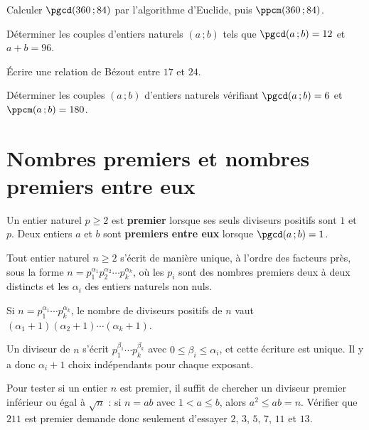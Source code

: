 \begin{entrainement}
\exo[\niveau{1}] Calculer $\pgcd(360\,;84)$ par l'algorithme d'Euclide, puis
$\ppcm(360\,;84)$.

\exo[\niveau{2}] Déterminer les couples d'entiers naturels $(a\,;b)$ tels que
$\pgcd(a\,;b) = 12$ et $a+b = 96$.

\exo[\niveau{2}] Écrire une relation de Bézout entre $17$ et $24$.

\exo[\niveau{3}] Déterminer les couples $(a\,;b)$ d'entiers naturels vérifiant
$\pgcd(a\,;b) = 6$ et $\ppcm(a\,;b) = 180$.
\end{entrainement}

\section{Nombres premiers et nombres premiers entre eux}

\begin{definition}
Un entier naturel $p \geq 2$ est \textbf{premier} lorsque ses seuls diviseurs
positifs sont $1$ et $p$. Deux entiers $a$ et $b$ sont \textbf{premiers entre
eux} lorsque $\pgcd(a\,;b) = 1$.
\end{definition}

\begin{theoreme}
Tout entier naturel $n \geq 2$ s'écrit de manière unique, à l'ordre des
facteurs près, sous la forme
$n = p_{1}^{\alpha_{1}}p_{2}^{\alpha_{2}}\cdots p_{k}^{\alpha_{k}}$, où les
$p_{i}$ sont des nombres premiers deux à deux distincts et les $\alpha_{i}$
des entiers naturels non nuls.
\end{theoreme}

\begin{propriete}
Si $n = p_{1}^{\alpha_{1}}\cdots p_{k}^{\alpha_{k}}$, le nombre de diviseurs
positifs de $n$ vaut $(\alpha_{1}+1)(\alpha_{2}+1)\cdots(\alpha_{k}+1)$.
\end{propriete}

\begin{demonstration}
Un diviseur de $n$ s'écrit $p_{1}^{\beta_{1}}\cdots p_{k}^{\beta_{k}}$ avec
$0 \leq \beta_{i} \leq \alpha_{i}$, et cette écriture est unique. Il y a donc
$\alpha_{i}+1$ choix indépendants pour chaque exposant.
\end{demonstration}

\begin{remarque}
Pour tester si un entier $n$ est premier, il suffit de chercher un diviseur
premier inférieur ou égal à $\sqrt n$ : si $n = ab$ avec $1<a\leq b$, alors
$a^{2} \leq ab = n$. Vérifier que $211$ est premier demande donc seulement
d'essayer $2$, $3$, $5$, $7$, $11$ et $13$.
\end{remarque}

